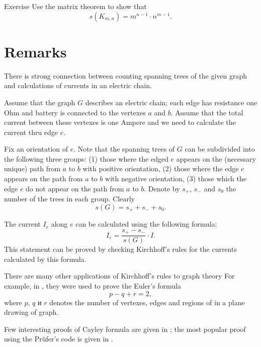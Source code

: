 \begin{thm}{Exercise}
Use the matrix theorem to show that 
\[s(K_{m,n})=m^{n-1}\cdot n^{m-1}.\]
\end{thm}



\section*{Remarks}

There is strong connection between counting spanning trees of the given graph and calculations of currents in an electric chain.

Assume that the graph $G$ describes an electric chain;
each edge has resistance one Ohm and battery is connected to the vertexes $a$ and $b$.
Assume that the total current between these vertexes is one Ampere and we need to calculate the current thru edge $e$.

Fix an orientation of $e$.
Note that the spanning trees of $G$ can be subdivided into the following three groups:
(1) those where the edged $e$ appears on the (necessary unique) path from $a$ to $b$ with positive orientation,
(2) those where the edge $e$ appears on the path from $a$ to $b$ with negative orientation,
(3) those which the edge $e$ do not appear on the path from $a$ to $b$.
Denote by $s_+$, $s_-$ and $s_0$ the number of the trees in each group.
Clearly 
\[s(G)=s_++s_-+s_0.\]

The current $I_e$ along $e$ can be calculated using the following formula:
\[I_e=\frac{s_+-s_-}{s(G)}\cdot I.\]
This statement can be proved by checking Kirchhoff's rules for the currents calculated by this formula.

There are many other applications of Kirchhoff's rules to graph theory
For example, in \cite{levi}, they were used to prove the Euler's formula
\[p-q+r=2,\]
where $p$, $q$ и $r$ denotes the number of vertexes, edges and regions of in a plane drawing of graph.

Few interesting proofs of Cayley formula are given in \cite[Chapter 30]{aigner-ziegler};
the most popular proof using the Pr\"ufer's code is given in \cite{pearls}.

